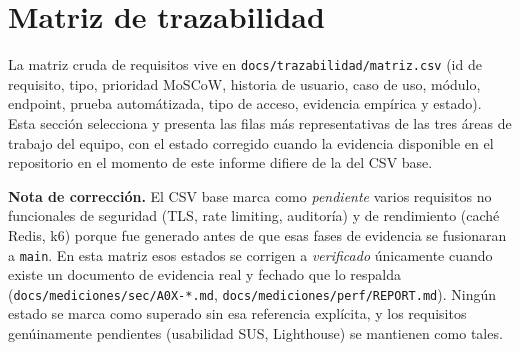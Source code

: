 \chapter{Matriz de trazabilidad}
\label{cap:trazabilidad}

La matriz cruda de requisitos vive en
\texttt{docs/trazabilidad/matriz.csv} (id de requisito, tipo, prioridad
MoSCoW, historia de usuario, caso de uso, m\'odulo, endpoint, prueba
autom\'atizada, tipo de acceso, evidencia emp\'irica y estado). Esta secci\'on
selecciona y presenta las filas m\'as representativas de las tres \'areas
de trabajo del equipo, con el estado corregido cuando la evidencia
disponible en el repositorio en el momento de este informe difiere de la
del CSV base.

\textbf{Nota de correcci\'on.} El CSV base marca como \emph{pendiente}
varios requisitos no funcionales de seguridad (TLS, rate limiting,
auditor\'ia) y de rendimiento (cach\'e Redis, k6) porque fue generado antes
de que esas fases de evidencia se fusionaran a \texttt{main}. En esta
matriz esos estados se corrigen a \emph{verificado} \'unicamente cuando
existe un documento de evidencia real y fechado que lo respalda
(\texttt{docs/mediciones/sec/A0X-*.md}, \texttt{docs/mediciones/perf/REPORT.md}).
Ning\'un estado se marca como superado sin esa referencia expl\'icita, y los
requisitos gen\'uinamente pendientes (usabilidad SUS, Lighthouse) se
mantienen como tales.

